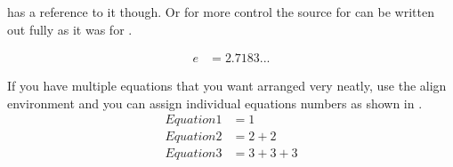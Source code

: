    has a reference to it though. Or for more control the source for  can be written out fully as it was for .
  
  \begin{align}\label{eq:quickEq2}
    e & = 2.7183...
  \end{align}
  
  If you have multiple equations that you want arranged very neatly, use the align environment and you can assign individual equations numbers as shown in .
  \begin{align}%
    \label{eq:multiref:a} Equation1 & = 1\\
    \label{eq:multiref:b} Equation2 & = 2 + 2\\
    \label{eq:multiref:c} Equation3 & = 3 + 3 + 3
  \end{align}
  
  
  
  \printreferences %
